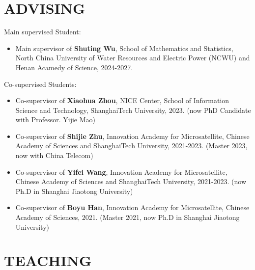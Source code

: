 \documentclass[paper=a4,fontsize=11pt]{scrartcl} %
\newcommand{\NewPart}[1]{\section*{\uppercase{#1}}}
\begin{document}
\NewPart{Advising}

Main supervised Student:
\begin{itemize}
		\item Main supervisor of \textbf{Shuting Wu}, School of Mathematics and Statistics, North China University of Water Resources and Electric Power (NCWU) and Henan Acamedy of Science, 2024-2027. 
\end{itemize}

Co-supervised Students:
\begin{itemize}
	
	
	\item Co-supervisor of \textbf{Xiaohua Zhou}, NICE Center, School of Information Science and
	Technology, ShanghaiTech University, 2023. (now PhD Candidate with Professor.
	Yijie Mao)
	
	\item Co-supervisor of \textbf{Shijie Zhu}, Innovation Academy for Microsatellite, Chinese Academy
	of Sciences and ShanghaiTech University, 2021-2023. (Master 2023, now with China
	Telecom)
	
	
	\item Co-supervisor of \textbf{Yifei Wang}, Innovation Academy for Microsatellite, Chinese
	Academy of Sciences and ShanghaiTech University, 2021-2023. (now Ph.D in Shanghai Jiaotong University)
	
	\item Co-supervisor of \textbf{Boyu Han}, Innovation Academy for Microsatellite, Chinese Academy
	of Sciences, 2021. (Master 2021, now Ph.D in Shanghai Jiaotong University)
\end{itemize}

\NewPart{Teaching}
\end{document}
